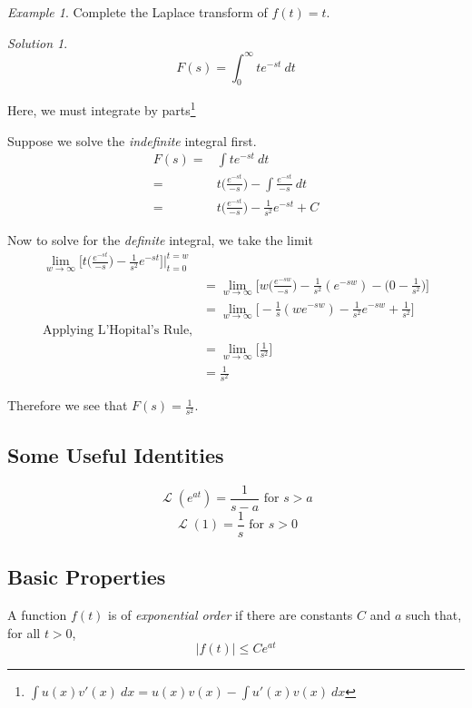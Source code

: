 \documentclass[a4paper]{article}
\DeclareMathOperator{\Lapl}{\mathcal{L}}
\theoremstyle{remark}
\newtheorem*{solution}{Solution}
\theoremstyle{theorem}
\newtheorem{example}{Example}
\begin{document}
\begin{example}
	Complete the Laplace transform of $f(t) = t$.
\end{example}

\begin{solution}
	\begin{equation}
		F(s) = \int_0^\infty te^{-st}\:dt
	\end{equation}
	
	Here, we must integrate by parts\footnote{$\int u(x)v'(x)\:dx = u(x)v(x) - \int u'(x)v(x)\:dx$}

	Suppose we solve the \emph{indefinite} integral first.	
	\begin{align}
		F(s) 	= & \int te^{-st}\:dt \\
				= & t\Big(\frac{e^{-st}}{-s}\Big) - \int \frac{e^{-st}}{-s}\:dt \\
				= & t\Big(\frac{e^{-st}}{-s}\Big) - \frac{1}{s^2}e^{-st} + C
	\end{align}

	Now to solve for the \emph{definite} integral, we take the limit
	\begin{align}
		\lim_{w\to\infty} \Big[ t\Big(\frac{e^{-st}}{-s}\Big) - \frac{1}{s^2}e^{-st}\Big] \Big|_{t=0}^{t=w}\\
		& = \lim_{w\to\infty} \Big[ w\Big(\frac{e^{-sw}}{-s}\Big) -\frac{1}{s^2}(e^{-sw}) - \Big(0-\frac{1}{s^2}\Big) \Big] \\
		& = \lim_{w\to\infty} \Big[ -\frac{1}{s}(we^{-sw}) - \frac{1}{s^2}e^{-sw} + \frac{1}{s^2} \Big]\\
		\text{Applying L'Hopital's Rule,}\\
		& = \lim_{w\to\infty} \Big[\frac{1}{s^2}\Big] \\
		& = \frac{1}{s^2} 
	\end{align}

	Therefore we see that $F(s) = \frac{1}{s^2}$.
\end{solution}

\subsection{Some Useful Identities}
\begin{equation}
	\Lapl{(e^{at})} = \frac{1}{s-a} \text{ for } s > a
\end{equation}
\begin{equation}
	\Lapl{(1)} = \frac{1}{s} \text{ for } s > 0
\end{equation}

\subsection{Basic Properties}
A function $f(t)$ is of \emph{exponential order} if there are constants $C$ and $a$ such that, for all $t>0$,
\begin{equation}
	|f(t)| \leq Ce^{at}
\end{equation}
\end{document}

